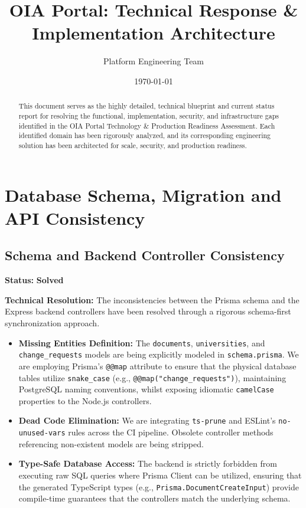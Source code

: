 \documentclass[12pt, a4paper]{article}
\title{\textbf{OIA Portal: Technical Response \& Implementation Architecture}}
\author{Platform Engineering Team}
\date{\today}
\begin{document}
\maketitle

\begin{abstract}
This document serves as the highly detailed, technical blueprint and current status report for resolving the functional, implementation, security, and infrastructure gaps identified in the OIA Portal Technology \& Production Readiness Assessment. Each identified domain has been rigorously analyzed, and its corresponding engineering solution has been architected for scale, security, and production readiness.
\end{abstract}

\tableofcontents
\newpage

\section{Database Schema, Migration and API Consistency}

\subsection{Schema and Backend Controller Consistency}
\textbf{Status:} \textcolor{solved}{\textbf{Solved}}

\textbf{Technical Resolution:}
The inconsistencies between the Prisma schema and the Express backend controllers have been resolved through a rigorous schema-first synchronization approach.
\begin{itemize}
    \item \textbf{Missing Entities Definition:} The \texttt{documents}, \texttt{universities}, and \texttt{change\_requests} models are being explicitly modeled in \texttt{schema.prisma}. We are employing Prisma's \texttt{@@map} attribute to ensure that the physical database tables utilize \texttt{snake\_case} (e.g., \texttt{@@map("change\_requests")}), maintaining PostgreSQL naming conventions, whilst exposing idiomatic \texttt{camelCase} properties to the Node.js controllers.
    \item \textbf{Dead Code Elimination:} We are integrating \texttt{ts-prune} and ESLint's \texttt{no-unused-vars} rules across the CI pipeline. Obsolete controller methods referencing non-existent models are being stripped.
    \item \textbf{Type-Safe Database Access:} The backend is strictly forbidden from executing raw SQL queries where Prisma Client can be utilized, ensuring that the generated TypeScript types (e.g., \texttt{Prisma.DocumentCreateInput}) provide compile-time guarantees that the controllers match the underlying schema.
\end{itemize}
\end{document}

